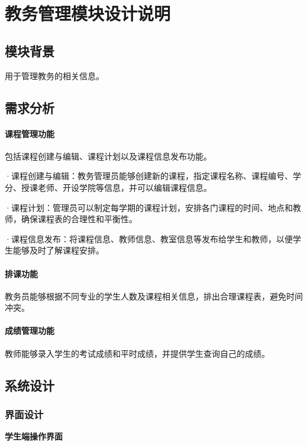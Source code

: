 \documentclass{article}
\begin{document}
\section{教务管理模块设计说明}
\subsection{模块背景}
  用于管理教务的相关信息。
\subsection{需求分析}

\paragraph{课程管理功能} 包括课程创建与编辑、课程计划以及课程信息发布功能。

·课程创建与编辑：教务管理员能够创建新的课程，指定课程名称、课程编号、学分、授课老师、开设学院等信息，并可以编辑课程信息。

·课程计划：管理员可以制定每学期的课程计划，安排各门课程的时间、地点和教师，确保课程表的合理性和平衡性。

·课程信息发布：将课程信息、教师信息、教室信息等发布给学生和教师，以便学生能够及时了解课程安排。

\paragraph{排课功能}
教务员能够根据不同专业的学生人数及课程相关信息，排出合理课程表，避免时间冲突。

\paragraph{成绩管理功能}
教师能够录入学生的考试成绩和平时成绩，并提供学生查询自己的成绩。

\subsection{系统设计}
\subsubsection{界面设计}

\begin{center}
\textbf{学生端操作界面}
\end{center}
\end{document}
